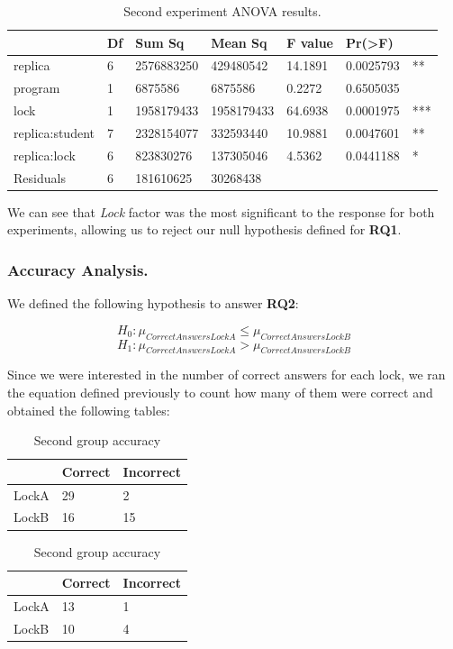 \begin{table}
\begin{center}
\caption{Second experiment ANOVA results.}
\begin{tabular}{|l|l|l|l|l|ll|}
\hline
                 & Df &    Sum Sq &   Mean Sq  & F value &   Pr(>F) & \\   
\hline
replica          & 6 & 2576883250 &  429480542 & 14.1891 & 0.0025793 & **  \\
program          & 1 &    6875586 &    6875586 &  0.2272 & 0.6505035 &     \\
lock             & 1 & 1958179433 & 1958179433 & 64.6938 & 0.0001975 & *** \\
replica:student  & 7 & 2328154077 &  332593440 & 10.9881 & 0.0047601 & **  \\
replica:lock     & 6 &  823830276 &  137305046 &  4.5362 & 0.0441188 & *   \\
Residuals        & 6 &  181610625 &   30268438 &         &           &     \\
\hline
\end{tabular}
\end{center}
\end{table}

We can see that \emph{Lock} factor was the most significant to the response for both experiments, allowing us to reject our null hypothesis defined for {\bf RQ1}.

\subsubsection{Accuracy Analysis.}

We defined the following hypothesis to answer {\bf RQ2}:

\begin{equation}
  H_{0} : \mu_{CorrectAnswersLockA} \leq \mu_{CorrectAnswersLockB}
\end{equation}
\begin{equation}
  H_{1} : \mu_{CorrectAnswersLockA} > \mu_{CorrectAnswersLockB}
\end{equation}

Since we were interested in the number of correct answers for each lock, we ran the equation defined previously to count how many of them were correct and obtained the following tables:

\begin{table}
\parbox{.45\linewidth}{
\centering
\begin{tabular}{|l|l|l|}
\hline
 & Correct & Incorrect\\
\hline
LockA & 29 & 2\\
LockB & 16 & 15\\
\hline
\end{tabular}
\caption{First group accuracy}
}
\hfill
\parbox{.45\linewidth}{
\centering
\begin{tabular}{|l|l|l|}
\hline
 & Correct & Incorrect\\
\hline
LockA & 13 & 1\\
LockB & 10 & 4\\
\hline
\end{tabular}
\caption{Second group accuracy}
}
\end{table}


